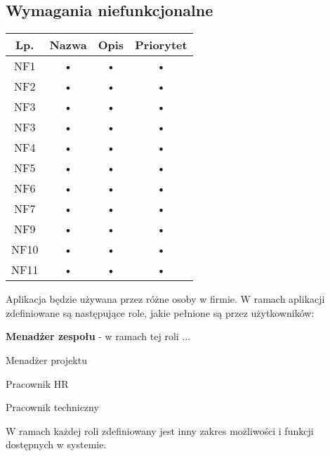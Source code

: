 \subsection{Wymagania niefunkcjonalne}

\begin{tabular}{|c|c|c|c|}
\hline 
Lp. & Nazwa & Opis & Priorytet \\ 
\hline 
NF1 & • & • & • \\ 
\hline 
NF2 & • & • & • \\ 
\hline 
NF3 & • & • & • \\ 
\hline 
NF3 & • & • & • \\ 
\hline 
NF4 & • & • & • \\ 
\hline 
NF5 & • & • & • \\ 
\hline 
NF6 & • & • & • \\ 
\hline 
NF7 & • & • & • \\ 
\hline 
NF9 & • & • & • \\ 
\hline 
NF10 & • & • & • \\ 
\hline 
NF11 & • & • & • \\ 
\hline 
\end{tabular}

Aplikacja będzie używana przez różne osoby w firmie. W ramach aplikacji zdefiniowane są następujące role, jakie pełnione są przez użytkowników:
\begin{itemize*}
\item \textbf{Menadżer zespołu} - w ramach tej roli ...
\item Menadżer projektu
\item Pracownik HR
\item Pracownik techniczny
\end{itemize*}
W ramach każdej roli zdefiniowany jest inny zakres możliwości i funkcji dostępnych w systemie.

